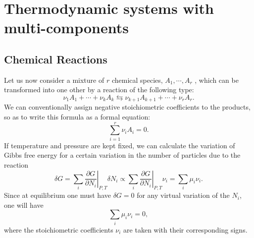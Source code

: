 \section{Thermodynamic systems with multi-components}
\subsection{Chemical Reactions}
Let us now consider a mixture of $r$ chemical species, $A_1,\cdots,A_r$ , which can be transformed into one other by a reaction of the following type:
\[\nu_1A_1+\cdots+\nu_kA_k　\leftrightarrows　\nu_{k+1}A_{k+1}+\cdots+\nu_rA_r.\]
We can conventionally assign negative stoichiometric coefficients to the products, so as to write this formula as a formal equation:
\[\sum_{i=1}^r \nu_iA_i = 0.\]
If temperature and pressure are kept fixed, we can calculate the variation of Gibbs free energy for a certain variation in the number of particles due to the reaction
\[\delta G = \sum_i \left. \frac{\partial G}{\partial N_i} \right|_{P,T} \delta N_i \propto \sum_i \left. \frac{\partial G}{\partial N_i} \right|_{P,T} \nu_i = \sum_{i} \mu_i\nu_i.\]
Since at equilibrium one must have $\delta G = 0$ for any virtual variation of the $N_i$, one will have
\[\sum_{i} \mu_i\nu_i = 0,\]
where the stoichiometric coefficients $\nu_i$ are taken with their corresponding signs.

